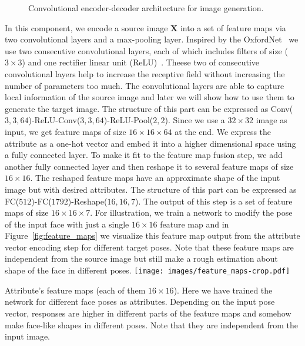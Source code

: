 \documentclass[10pt,twocolumn,letterpaper]{article}
\begin{document}
\begin{figure*}[t!]
\centering
{}
\caption{Convolutional encoder-decoder architecture for image generation.}
\label{fig:network_stage1}
\end{figure*}{}%
In this component, we encode a source image $\mathbf{X}$ into a set of feature maps via two convolutional layers and a max-pooling layer.
Inspired by the OxfordNet~\cite{Simonyan-iclr15}
we use two consecutive convolutional layers, each of which includes filters of size ($3\times3$)
and one rectifier linear unit (ReLU)~\cite{Krizhevsky-nips12}.
Theese two of consecutive convolutional layers help to increase the receptive field without increasing the number of parameters too much.
The convolutional layers are able to capture local information of the source image
and later we will show how to use them to generate the target image.
The structure of this part can be expressed as
Conv($3,3,64$)-ReLU-Conv($3,3,64$)-ReLU-Pool($2,2$). %
Since we use a $32\times32$ image as input, we get feature maps of size $16\times16\times64$ at the end.
We express the attribute as a one-hot vector and embed it into a higher dimensional space using a fully connected layer.
To make it fit to the feature map fusion step,
we add another fully connected layer and then reshape it to several feature maps of size $16\times16$.
The reshaped feature maps have an approximate shape of the input image but with desired attributes.
The structure of this part can be expressed as
FC($512$)-FC($1792$)-Reshape($16,16,7$).
The output of this step is a set of feature maps of size $16\times16\times7$.
For illustration, we train a network to modify the pose of the input face with just a single $16\times16$ feature map and in Figure~\ref{fig:feature_maps} we visualize this feature map output from the attribute vector encoding step for different target poses. Note that these feature maps are independent from the source image but still make a rough estimation about shape of the face in different poses.
\centering
\texttt{[image: images/feature\_maps-crop.pdf]} %
\caption{Attribute's feature maps (each of them $16\times16$). Here we have trained the network for different face poses as attributes. Depending on the input pose vector, responses are  higher in different parts of the feature maps and somehow make face-like shapes in different poses. Note that they are independent from the input image.}
\end{document}
